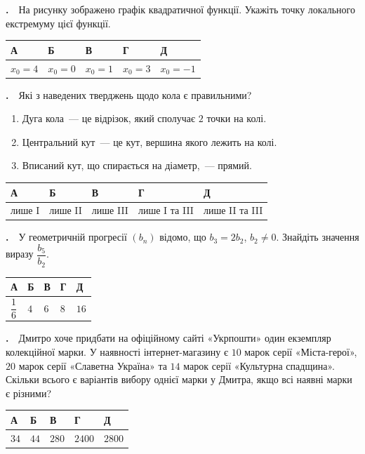\documentclass[12pt]{article}
\newcommand{\answerTable}[5]{%
\par\vspace{0.15cm}
\noindent
\begin{tabular}{|*{5}{>{\centering\arraybackslash}m{3cm}|}}
\hline
\rule[-0.15cm]{0pt}{0.6cm}\textbf{А} & \rule[-0.15cm]{0pt}{0.6cm}\textbf{Б} & \rule[-0.15cm]{0pt}{0.6cm}\textbf{В} & \rule[-0.15cm]{0pt}{0.6cm}\textbf{Г} & \rule[-0.15cm]{0pt}{0.6cm}\textbf{Д} \\
\hline
\rule[-0.2cm]{0pt}{0.75cm}#1 & \rule[-0.2cm]{0pt}{0.75cm}#2 & \rule[-0.2cm]{0pt}{0.75cm}#3 & \rule[-0.2cm]{0pt}{0.75cm}#4 & \rule[-0.2cm]{0pt}{0.75cm}#5 \\
\hline
\end{tabular}
\par\vspace{0.25cm}
}
\newcommand{\answerTableTall}[5]{%
\par\vspace{0.15cm}
\noindent
\begin{tabular}{|*{5}{>{\centering\arraybackslash}m{3cm}|}}
\hline
\rule[-0.2cm]{0pt}{0.7cm}\textbf{А} & \rule[-0.2cm]{0pt}{0.7cm}\textbf{Б} & \rule[-0.2cm]{0pt}{0.7cm}\textbf{В} & \rule[-0.2cm]{0pt}{0.7cm}\textbf{Г} & \rule[-0.2cm]{0pt}{0.7cm}\textbf{Д} \\
\hline
\rule[-0.45cm]{0pt}{1.2cm}#1 & \rule[-0.45cm]{0pt}{1.2cm}#2 & \rule[-0.45cm]{0pt}{1.2cm}#3 & \rule[-0.45cm]{0pt}{1.2cm}#4 & \rule[-0.45cm]{0pt}{1.2cm}#5 \\
\hline
\end{tabular}
\par\vspace{0.25cm}
}
\newcounter{zad}
\newcommand{\zadtask}[1]{\stepcounter{zad}\par\vspace{0.3cm}\noindent\textbf{\thezad.}\ \ #1\par\vspace{0.2cm}}
\newcommand{\zadnum}{\stepcounter{zad}\noindent\textbf{\thezad.}\ \ }
\begin{document}
\noindent
\begin{minipage}[c]{0.58\textwidth}
\zadnum На рисунку зображено графік квадратичної функції. Укажіть точку локального екстремуму цієї функції.
\end{minipage}%
\hfill
\begin{minipage}[c]{0.40\textwidth}
\centering
{}
\end{minipage}
\par\vspace{0.2cm}
\answerTable{$x_0 = 4$}{$x_0 = 0$}{$x_0 = 1$}{$x_0 = 3$}{$x_0 = -1$}

\zadtask{Які з наведених тверджень щодо кола є правильними?
\vspace{0.1cm}
\begin{enumerate}[label=\textbf{\Roman*.}, align=left, leftmargin=2.6em, labelsep=0.5em, itemsep=0.08cm, topsep=0.06cm]
\item Дуга кола~--- це відрізок, який сполучає $2$ точки на колі.
\item Центральний кут~--- це кут, вершина якого лежить на колі.
\item Вписаний кут, що спирається на діаметр,~--- прямий.
\end{enumerate}
\vspace{0.1cm}}
\answerTable{лише I}{лише II}{лише III}{лише I та III}{лише II та III}

\zadtask{У геометричній прогресії $(b_n)$ відомо, що $b_3 = 2b_2$, $b_2 \neq 0$. Знайдіть значення виразу $\dfrac{b_5}{b_2}$.}
\answerTableTall{$\dfrac{1}{6}$}{$4$}{$6$}{$8$}{$16$}
\newpage

\zadtask{Дмитро хоче придбати на офіційному сайті «Укрпошти» один екземпляр колекційної марки. У наявності інтернет-магазину є $10$ марок серії «Міста-герої», $20$ марок серії «Славетна Україна» та $14$ марок серії «Культурна спадщина». Скільки всього є варіантів вибору однієї марки у Дмитра, якщо всі наявні марки є різними?}
\answerTable{$34$}{$44$}{$280$}{$2400$}{$2800$}
\end{document}
